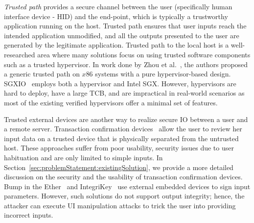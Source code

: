 \emph{Trusted path} provides a secure channel between the user (specifically human interface device - HID) and the end-point, which is typically a trustworthy application running on the host. Trusted path ensures that user inputs reach the intended application unmodified, and all the outputs presented to the user are generated by the legitimate application. Trusted path to the local host is a well-researched area where many solutions focus on using trusted software components such as a trusted hypervisor. In work done by Zhou et al.~\cite{zhou2012building}, the authors proposed a generic trusted path on $x86$ systems with a pure hypervisor-based design. SGXIO~\cite{weiser2017sgxio} employs both a hypervisor and Intel SGX. However, hypervisors are hard to deploy, have a large TCB, and are impractical in real-world scenarios as most of the existing verified hypervisors offer a minimal set of features. 


Trusted external devices are another way to realize secure IO between a user and a remote server. Transaction confirmation devices~\cite{filyanov2011uni,weigold2011secure} allow the user to review her input data on a trusted device that is physically separated from the untrusted host. These approaches suffer from poor usability, security issues due to user habituation and are only limited to simple inputs. In Section~\ref{sec:problemStatement:existingSolution}, we provide a more detailed discussion on the security and the usability of transaction confirmation devices. Bump in the Ether~\cite{McCPerRei2006} and IntegriKey~\cite{IntegriKey} use external embedded devices to sign input parameters. However, such solutions do not support output integrity; hence, the attacker can execute UI manipulation attacks to trick the user into providing incorrect inputs. %


